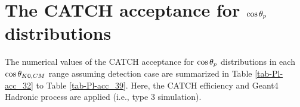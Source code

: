%

\def\thesection{Appendix A.\arabic{section}}
\chapter{The CATCH acceptance for $\cos{\theta_p}$ distributions}
\label{chap-appA}

The numerical values of the CATCH acceptance for $\cos{\theta_p}$ distributions in each $\cos{\theta_{K0,CM}}$ range assuming detection case  are summarized in Table \ref{tab-Pl-acc_32} to Table \ref{tab-Pl-acc_39}. Here, the CATCH efficiency and Geant4 Hadronic process are applied (i.e., type 3 simulation).

